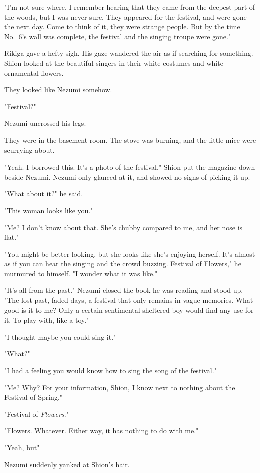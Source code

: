 "I'm not sure where. I remember hearing that they came from the deepest part of the woods, but I was never sure. They appeared for the festival, and were gone the next day. Come to think of it, they were strange people. But by the time No.~6's wall was complete, the festival and the singing troupe were gone."

Rikiga gave a hefty sigh. His gaze wandered the air as if searching for something. Shion looked at the beautiful singers in their white costumes and white ornamental flowers.

They looked like Nezumi somehow.

\mybreak

"Festival?"

Nezumi uncrossed his legs.

They were in the basement room. The stove was burning, and the little mice were scurrying about.

"Yeah. I borrowed this. It's a photo of the festival." Shion put the magazine down beside Nezumi. Nezumi only glanced at it, and showed no signs of picking it up.

"What about it?" he said.

"This woman looks like you."

"Me? I don't know about that. She's chubby compared to me, and her nose is flat."

"You might be better-looking, but she looks like she's enjoying herself. It's almost as if you can hear the singing and the crowd buzzing. Festival of Flowers," he murmured to himself. "I wonder what it was like."

"It's all from the past." Nezumi closed the book he was reading and stood up. "The lost past, faded days, a festival that only remains in vague memories. What good is it to me? Only a certain sentimental sheltered boy would find any use for it. To play with, like a toy."

"\el I thought maybe you could sing it."

"What?"

"I had a feeling you would know how to sing the song of the festival."

"Me? Why? For your information, Shion, I know next to nothing about the Festival of Spring."

"Festival of \emph{Flowers}."

"Flowers. Whatever. Either way, it has nothing to do with me."

"Yeah, but\el "

Nezumi suddenly yanked at Shion's hair.


